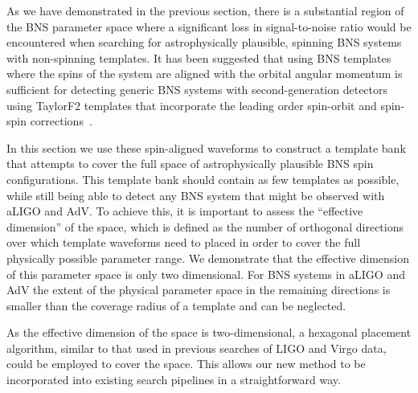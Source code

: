 As we have demonstrated in the previous section, there is a substantial region
of the BNS parameter space where a significant loss in signal-to-noise ratio
would be encountered when searching for astrophysically plausible, spinning
BNS systems with non-spinning templates. It has been suggested that using BNS
templates where the spins of the system are aligned with the orbital angular
momentum is sufficient for detecting generic BNS systems with second-generation
detectors~\cite{Ajith:2011ec} using TaylorF2 templates that incorporate the
leading order spin-orbit and spin-spin corrections~\cite{PW95}. 

In this section we use these spin-aligned waveforms to construct a template
bank that attempts to cover the full space of astrophysically plausible BNS
spin configurations. This template bank should contain as few templates as
possible, while still being able to detect any BNS system that might be
observed with aLIGO and AdV. To achieve this, it is important to assess the
``effective dimension'' of the space, which is defined as the number of orthogonal
directions
over which template waveforms need to placed in order to cover the full physically
possible parameter range. 
We demonstrate that the effective dimension
of this parameter space is only two dimensional. For BNS systems in aLIGO and AdV
the extent of the physical parameter space in the remaining directions is smaller
than the coverage radius of a template and can be neglected.

As the effective dimension of the space is two-dimensional, a
hexagonal placement algorithm, similar to that used in previous searches of
LIGO and Virgo data, could be employed to cover the space. This allows our new
method to be incorporated into existing search pipelines in a straightforward
way.


